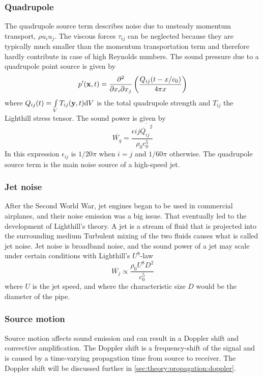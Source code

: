 \subsubsection*{Quadrupole}
The quadrupole source term describes noise due to unsteady
momentum transport, $\rho u_i u_j$. The viscous forces $\tau_{ij}$ can be
neglected because they are typically much smaller than the momentum
transportation term and therefore hardly contribute in case of high Reynolds
numbers. The sound pressure due to a quadrupole point source is given by
\begin{equation}
  p'(\mathbf{x},t) = \frac{\partial^2}{\partial x_i \partial x_j} \left( \frac{Q_{ij} (t-x/c_0)}{4 \pi x}  \right)
\end{equation}
where $Q_{ij}(t) = \int\limits_V T_{ij}(\mathbf{y},t) \mathrm{d} V$ is the total quadrupole strength and $T_{ij}$ the Lighthill stress tensor.
The sound power is given by
\begin{equation}
  \overline{W_q} = \frac{\epsilon{ij} \overline{\ddot{Q_{ij}}^2} }{\rho_0 c_0^5}
\end{equation}
In this expression $\epsilon_{ij}$ is $1/20\pi$ when $i=j$ and $1/60\pi$ otherwise.
The quadrupole source term is the main noise source of a high-speed jet.

\subsubsection*{Jet noise}
After the Second World War, jet engines began to be used in commercial
airplanes, and their noise emission was a big issue. That eventually led to the
development of Lighthill's theory.
A jet is a stream of fluid that is projected into the surrounding medium
Turbulent mixing of the two fluids causes what is called jet noise. Jet noise is broadband noise, and the
sound power of a jet may scale under certain conditions with Lighthill's $U^8$-law
\begin{equation}
  \overline{W_{j}} \propto \frac{\rho_0 U^8 D^2}{c_0^5}
\end{equation}
where $U$ is the jet speed, and where the characteristic size $D$ would be the diameter of the pipe.

\subsubsection{Source motion}
Source motion affects sound emission and can result in a Doppler shift and
convective amplification. The Doppler shift is a frequency-shift of the signal
and is caused by a time-varying propagation time from source to receiver. The
Doppler shift will be discussed further in \ref{sec:theory:propagation:doppler}.

